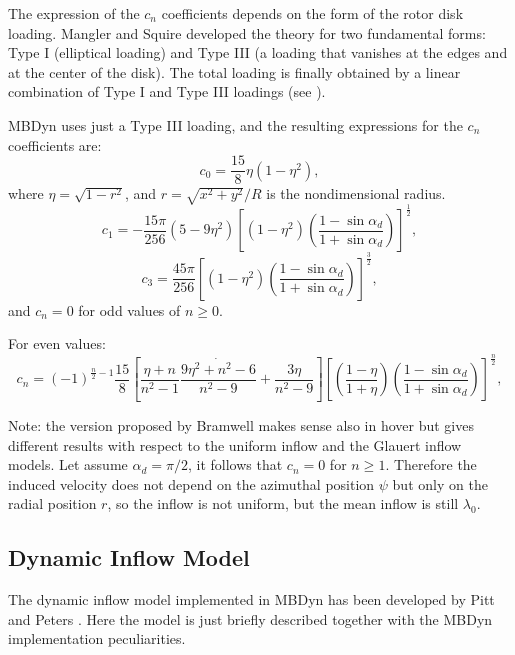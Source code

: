 The expression of the $c_n$ coefficients depends on the form of the 
rotor disk loading. Mangler and Squire developed the theory for two fundamental
forms: Type I (elliptical loading) and Type III (a loading that vanishes at the 
edges and at the center of the disk). The total loading is finally obtained by
a linear combination of Type I and Type III loadings (see \cite{LEISHMAN-2006}).

MBDyn uses just a Type III loading, and the resulting expressions for the
$c_n$ coefficients are:
\begin{equation}
c_0 = \frac{15}{8} \eta \left( 1-\eta^2 \right),
\end{equation}
where $\eta = \sqrt{ 1 - r^2}$,
and $r=\sqrt{x^2 + y^2}/R$ is the nondimensional radius.
\begin{equation}
c_1 = -\frac{ 15 \pi}{256} 
\left( 5 - 9 \eta^2 \right)
\left[ 
\left(1-\eta^2\right)
\left( \frac{1 - \sin{\alpha_d}}{1 + \sin{\alpha_d}} \right)
\right]^{\frac{1}{2}},
\end{equation}
\begin{equation}
c_3 = \frac{ 45 \pi}{256} 
\left[ 
\left(1-\eta^2\right)
\left( \frac{1 - \sin{\alpha_d}}{1 + \sin{\alpha_d}} \right)
\right]^{\frac{3}{2}},
\end{equation}
and $c_n = 0$ for odd values of $n \ge 0$.

For even values:
\begin{equation}
c_n = (-1)^{\frac{n}{2}-1} 
\frac{15}{8}
\left[ 
{\frac{\eta + n}{n^2 -1}} \dot {\frac{9 \eta^2 + n^2 -6}{n^2 -9}} + 
{\frac{ 3 \eta}{n^2 -9}} 
\right]
\left[ 
\left( \frac{1 - \eta}{1 + \eta} \right)
\left( \frac{1 - \sin{\alpha_d}}{1 + \sin{\alpha_d}} \right)
\right]^{\frac{n}{2}},
\end{equation}

Note: the version proposed by Bramwell \cite{BRAMWELL-1976}
makes sense also in hover but gives different
results with respect to the uniform inflow and the Glauert inflow models.
Let assume $\alpha_d = \pi/2$, it follows that $c_n = 0$ for $n \ge 1$.
Therefore the induced velocity does not depend on the azimuthal position 
$\psi$ but only on the radial position $r$, so the inflow is not uniform, 
but the mean inflow is still $\lambda_0$.

\subsection{Dynamic Inflow Model}

The dynamic inflow model implemented in MBDyn has been developed by Pitt
and Peters \cite{PITT}. 
Here the model is just briefly described together with the MBDyn implementation
peculiarities. 

